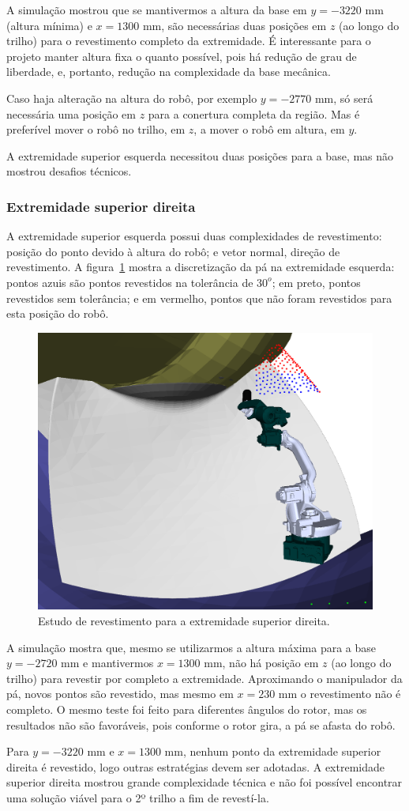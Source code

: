 A simulação mostrou que se mantivermos a altura da base em $y=-3220$ mm
(altura mínima) e $x=1300$ mm, são necessárias duas posições em $z$ (ao longo do
trilho) para o revestimento completo da extremidade. É interessante para o
projeto manter altura fixa o quanto possível, pois há redução de grau de
liberdade, e, portanto, redução na complexidade da base mecânica.

Caso haja alteração na altura do robô, por exemplo  $y=-2770$ mm, só será
necessária uma posição em $z$ para a conertura completa da região. Mas é
preferível mover o robô no trilho, em $z$, a mover o robô em altura, em $y$. 

A extremidade superior esquerda necessitou duas posições para a base, mas não
mostrou desafios técnicos.

\subsubsection{Extremidade superior direita}

A extremidade superior esquerda possui duas complexidades de revestimento:
posição do ponto devido à altura do robô; e vetor normal, direção de
revestimento. A figura~\ref{fig::shoulderright} mostra a discretização da pá na
extremidade esquerda: pontos azuis são pontos revestidos na tolerância de $30^o$; em preto, pontos revestidos sem tolerância; e em vermelho, pontos que
não foram revestidos para esta posição do robô.

\begin{figure}[!ht]
	\centering	
	\includegraphics[width=.5\columnwidth]{figs/shoulderright.png}
	\caption{Estudo de revestimento para a extremidade superior direita.}
	\label{fig::shoulderright}
\end{figure}

A simulação mostra que, mesmo se utilizarmos a altura máxima para a base
$y=-2720$ mm e mantivermos $x=1300$ mm, não há posição em $z$ (ao longo do
trilho) para revestir por completo a extremidade. Aproximando o manipulador da
pá, novos pontos são revestido, mas mesmo em $x=230$ mm o
revestimento não é completo. O mesmo teste foi feito para diferentes
ângulos do rotor, mas os resultados não são favoráveis, pois conforme o rotor
gira, a pá se afasta do robô.

Para $y=-3220$ mm e $x=1300$ mm, nenhum ponto da extremidade superior direita é
revestido, logo outras estratégias devem ser adotadas. A extremidade superior
direita mostrou grande complexidade técnica e não foi possível encontrar uma
solução viável para o 2º trilho a fim de revestí-la.